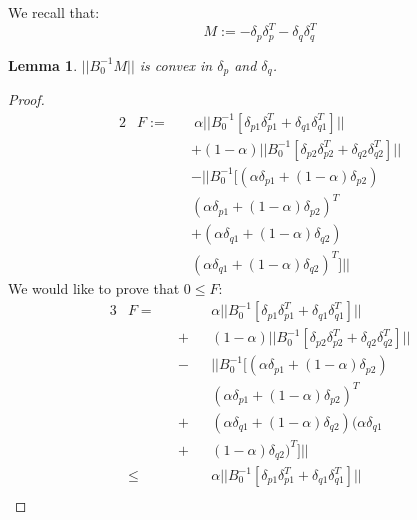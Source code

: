 \documentclass[11pt,twocolumn,varwidth=true,a4paper,fleqn]{article}
\newtheorem{lemma}{Lemma}
\begin{document}
We recall that:
\begin{equation*} 
M:= - \delta_p\delta_p^T - \delta_q\delta_q^T
\end{equation*}
\begin{lemma} \label{M}
$||B_0^{-1}M||$ is convex in $\delta_p$
and $\delta_q$.
\end{lemma}
\begin{proof}
\begin{alignat*}{2}
& F:=  && \ \alpha||B_0^{-1}[\delta_{p1}\delta_{p1}^T +
\delta_{q1}\delta_{q1}^T]|| \\
& && + (1-\alpha)||B_0^{-1}[\delta_{p2}\delta_{p2}^T +
\delta_{q2}\delta_{q2}^T]|| \\
& && - ||B_0^{-1}[(\alpha\delta_{p1}+(1-\alpha)\delta_{p2}) \\
& && (\alpha\delta_{p1} + (1-\alpha)\delta_{p2})^T  \\
& && + (\alpha\delta_{q1}+(1-\alpha)\delta_{q2}) \\
& && (\alpha\delta_{q1} + (1-\alpha)\delta_{q2})^T]||  
\end{alignat*}
We would like to prove that $0 \leq F$:
\begin{alignat*}{3}
& F=  && &&\alpha||B_0^{-1}[\delta_{p1}\delta_{p1}^T +
\delta_{q1}\delta_{q1}^T]|| \\
& && + &&(1-\alpha)||B_0^{-1}[\delta_{p2}\delta_{p2}^T +
\delta_{q2}\delta_{q2}^T]|| \\
& && - && ||B_0^{-1}[(\alpha\delta_{p1}+(1-\alpha)\delta_{p2}) \\
& && &&(\alpha\delta_{p1} + (1-\alpha)\delta_{p2})^T  \\
& && + && (\alpha\delta_{q1}+(1-\alpha)\delta_{q2})(\alpha\delta_{q1} \\
& && + && (1-\alpha)\delta_{q2})^T]||  \\
& \leq && && \alpha||B_0^{-1}[\delta_{p1}\delta_{p1}^T +
\delta_{q1}\delta_{q1}^T]||  \\

\end{alignat*}
\end{proof}
\end{document}
